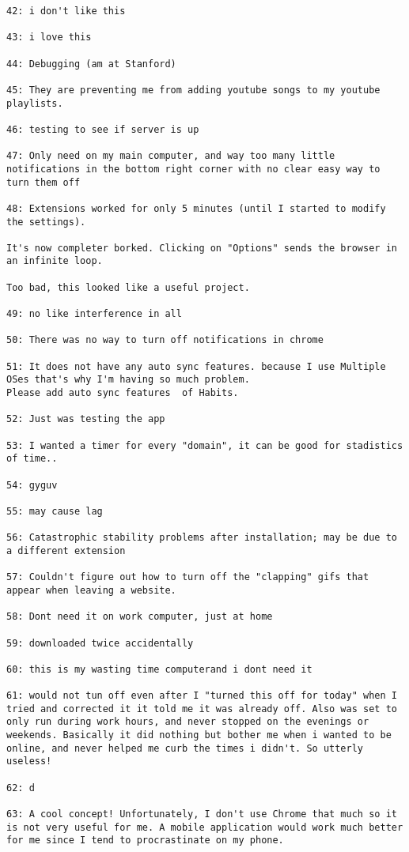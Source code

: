 \begin{lstlisting}[breaklines]
42: i don't like this

43: i love this

44: Debugging (am at Stanford)

45: They are preventing me from adding youtube songs to my youtube playlists.

46: testing to see if server is up

47: Only need on my main computer, and way too many little notifications in the bottom right corner with no clear easy way to turn them off

48: Extensions worked for only 5 minutes (until I started to modify the settings).

It's now completer borked. Clicking on "Options" sends the browser in an infinite loop.

Too bad, this looked like a useful project.

49: no like interference in all

50: There was no way to turn off notifications in chrome

51: It does not have any auto sync features. because I use Multiple OSes that's why I'm having so much problem.
Please add auto sync features  of Habits.

52: Just was testing the app

53: I wanted a timer for every "domain", it can be good for stadistics of time..

54: gyguv

55: may cause lag

56: Catastrophic stability problems after installation; may be due to a different extension

57: Couldn't figure out how to turn off the "clapping" gifs that appear when leaving a website.

58: Dont need it on work computer, just at home

59: downloaded twice accidentally

60: this is my wasting time computerand i dont need it

61: would not tun off even after I "turned this off for today" when I tried and corrected it it told me it was already off. Also was set to only run during work hours, and never stopped on the evenings or weekends. Basically it did nothing but bother me when i wanted to be online, and never helped me curb the times i didn't. So utterly useless!

62: d

63: A cool concept! Unfortunately, I don't use Chrome that much so it is not very useful for me. A mobile application would work much better for me since I tend to procrastinate on my phone.


\end{lstlisting}
